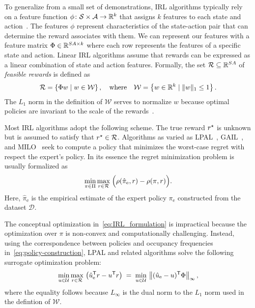\documentclass[10pt]{article}
\renewcommand{\cite}{\citep}
\theoremstyle{plain}
\theoremstyle{remark}
\begin{document}
To generalize from a small set of demonstrations, IRL algorithms typically rely on a feature function $\phi\colon \mathcal{S} \times \mathcal{A}\to \mathbb{R}^k$ that assigns $k$ features to each state and action~\cite{abbeel2004,Syed2008,Brown2018a,lacotte2019,chang2021mitigating,jonnavittula2021know,arora2021survey}. The features $\phi$ represent characteristics of the state-action pair that can determine the reward associates with them. We can represent our features with a feature matrix $\Phi \in \mathbb{R}^{SA\times k}$ where each row represents the features of a specific state and action. Linear IRL algorithms assume that rewards can be expressed as a linear combination of state and action features. Formally, the set $\mathcal{R} \subseteq \mathbb{R}^{SA}$ of \emph{feasible rewards} is defined as
\begin{equation} \label{eq:r-defintion}
  \mathcal{R} = \left\{ \Phi w \mid  w\in \mathcal{W} \right\}, \quad
  \text{where} \quad
  \mathcal{W} = \left\{ w \in \mathbb{R}^k \mid \| w \|_1 \le 1 \right\}. 
\end{equation}
The $L_1$ norm in the definition of $\mathcal{W}$ serves to normalize $w$ because optimal policies are invariant to the scale of the rewards~\cite{abbeel2004,Syed2008}. 

Most IRL algorithms adopt the following scheme. The true reward $r^{\mathnormal{\star}}$ is unknown but is assumed to satisfy that $r^{\mathnormal{\star}} \in \mathcal{R}$. Algorithms as varied as LPAL~\cite{Syed2008}, GAIL~\cite{Ho2016}, and MILO~\cite{chang2021mitigating} seek to compute a policy that minimizes the worst-case regret with respect the expert's policy. In its essence the regret minimization problem is usually formalized as
\begin{equation} \label{eq:IRL_formulation}
\min_{\pi \in \Pi} \max_{r \in \mathcal{R}} \; \Bigl( \rho(\hat{\pi}_{\mathrm{e}}, r) - \rho(\pi, r) \Bigr).
\end{equation}
Here, $\hat{\pi}_{\mathrm{e}}$ is the empirical estimate of the expert policy $\pi_{\mathrm{e}}$ constructed from the dataset $\mathcal{D}$.

The conceptual optimization in~\eqref{eq:IRL_formulation} is impractical because the optimization over $\pi$ is non-convex and computationally challenging. Instead, using the correspondence between policies and occupancy frequencies in~\eqref{eq:policy-construction}, LPAL and related algorithms solve the following surrogate optimization problem:
\begin{equation} \label{eq:irl-formulation-u}
  \min_{u\in \mathcal{U}} \max_{r\in \mathcal{R}} \, \left(\hat{u}_{\mathrm{e}}^{\mathsf{T}} r - u^{\mathsf{T}} r \right)
  \; =\; 
  \min_{u\in \mathcal{U}} \, \left\| (\hat{u}_{\mathrm{e}} - u)^{\mathsf{T}} \Phi \right\|_{\infty},
\end{equation}
where the equality follows because $L_{\infty}$ is the dual norm to the $L_1$ norm used in the defintion of $\mathcal{W}$.
\end{document}
